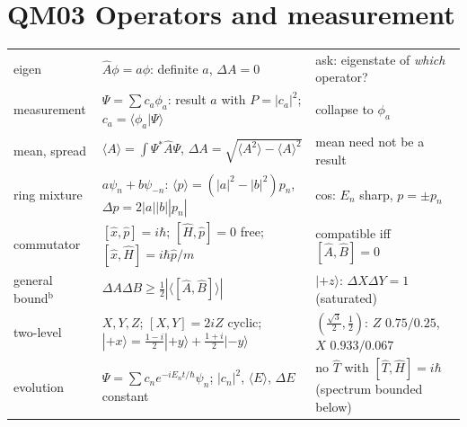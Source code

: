 \documentclass[9pt]{article}
\begin{document}
\section*{QM03 Operators and measurement}
\begin{tabular}{@{}p{2.8cm}p{8.3cm}p{6.3cm}@{}}
\toprule
eigen & $\hat A\phi=a\phi$: definite $a$, $\Delta A=0$ & ask: eigenstate of \emph{which} operator?\\
measurement & $\Psi=\sum c_a\phi_a$: result $a$ with $P=|c_a|^2$; $c_a=\langle\phi_a|\Psi\rangle$ & collapse to $\phi_a$\\
mean, spread & $\langle A\rangle=\int\Psi^*\hat A\Psi$, $\Delta A=\sqrt{\langle A^2\rangle-\langle A\rangle^2}$ & mean need not be a result\\
ring mixture & $a\psi_n+b\psi_{-n}$: $\langle p\rangle=(|a|^2-|b|^2)p_n$, $\Delta p=2|a||b||p_n|$ & cos: $E_n$ sharp, $p=\pm p_n$\\
commutator & $[\hat x,\hat p]=i\hbar$; $[\hat H,\hat p]=0$ free; $[\hat x,\hat H]=i\hbar\hat p/m$ & compatible iff $[\hat A,\hat B]=0$\\
general bound$^{\text{b}}$ & $\Delta A\Delta B\ge\tfrac12|\langle[\hat A,\hat B]\rangle|$ & $|{+z}\rangle$: $\Delta X\Delta Y=1$ (saturated)\\
two-level & $X,Y,Z$; $[X,Y]=2iZ$ cyclic; $|{+x}\rangle=\tfrac{1-i}2|{+y}\rangle+\tfrac{1+i}2|{-y}\rangle$ & $(\tfrac{\sqrt3}2,\tfrac12)$: $Z$ $0.75/0.25$, $X$ $0.933/0.067$\\
evolution & $\Psi=\sum c_ne^{-iE_nt/\hbar}\psi_n$; $|c_n|^2$, $\langle E\rangle$, $\Delta E$ constant & no $\hat T$ with $[\hat T,\hat H]=i\hbar$ (spectrum bounded below)\\
\bottomrule
\end{tabular}
\end{document}
